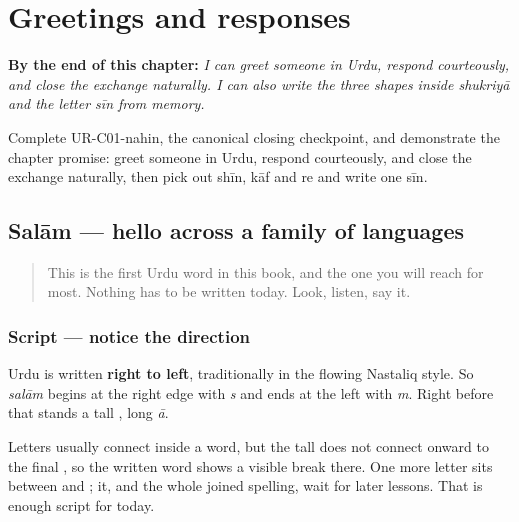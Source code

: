 
\chapter{Greetings and responses}
\label{ch:urdu-greetings}

\begin{chapteropening}
\textbf{By the end of this chapter:} \emph{I can greet someone in Urdu, respond courteously, and close the exchange naturally. I can also write the three shapes inside shukriyā and the letter sīn from memory.}

Complete UR-C01-nahin, the canonical closing checkpoint, and demonstrate the chapter promise: greet someone in Urdu, respond courteously, and close the exchange naturally, then pick out shīn, kāf and re and write one sīn.
\end{chapteropening}

\section[\texorpdfstring{\ur{سلام} (salām)}{سلام (salām)}]{Salām — hello across a family of languages}

\label{lesson:UR-C01-salam}



\begin{quote}
This is the first Urdu word in this book, and the one you will reach for most. Nothing has to be written today. Look, listen, say it.
\end{quote}

\subsection*{Script — notice the direction}
Urdu is written \textbf{right to left}, traditionally in the flowing Nastaliq style. So \emph{salām} begins at the right edge with \textbf{} \emph{s} and ends at the left with \textbf{} \emph{m}. Right before that \textbf{} stands a tall \textbf{}, long \emph{ā}.

Letters usually connect inside a word, but the tall \textbf{} does not connect onward to the final \textbf{}, so the written word shows a visible break there. One more letter sits between \textbf{} and \textbf{}; it, and the whole joined spelling, wait for later lessons. That is enough script for today.

